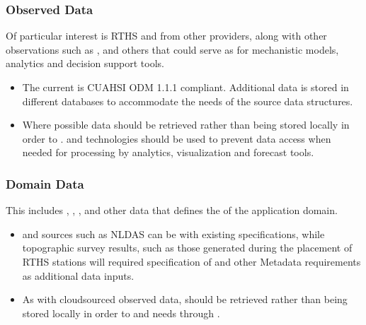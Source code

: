 \documentclass[letterpaper,12pt,english]{book}
\begin{document}
\subsubsection{Observed Data}
\label{\detokenize{requirements/data/observed:observed-data}}\label{\detokenize{requirements/data/observed::doc}}
\sphinxAtStartPar
Of particular interest is RTHS and  from other providers, along with other observations such as ,  and others that could serve as  for mechanistic models, analytics and decision support tools.
\begin{itemize}
\item {} 
\sphinxAtStartPar
The current  is CUAHSI ODM 1.1.1 compliant. Additional data is stored in different databases to accommodate the needs of the source data structures.

\item {} 
\sphinxAtStartPar
Where possible  data should be retrieved  rather than being stored locally in order to .  and  technologies should be used to prevent data access  when needed for processing by analytics, visualization and forecast tools.

\end{itemize}


\subsubsection{Domain Data}
\label{\detokenize{requirements/data/domain:domain-data}}\label{\detokenize{requirements/data/domain::doc}}
\sphinxAtStartPar
This includes , , ,
 and other data that defines the  of the
application domain.
\begin{itemize}
\item {} 
\sphinxAtStartPar
{} and  sources such as NLDAS can be  with existing  specifications, while topographic survey results, such as those generated during the placement of RTHS stations will required specification of  and other Metadata requirements as additional data inputs.

\item {} 
\sphinxAtStartPar
As with cloud\sphinxhyphen{}sourced observed data,  should be retrieved  rather than being stored locally in order to  and  needs through .

\end{itemize}
\end{document}
